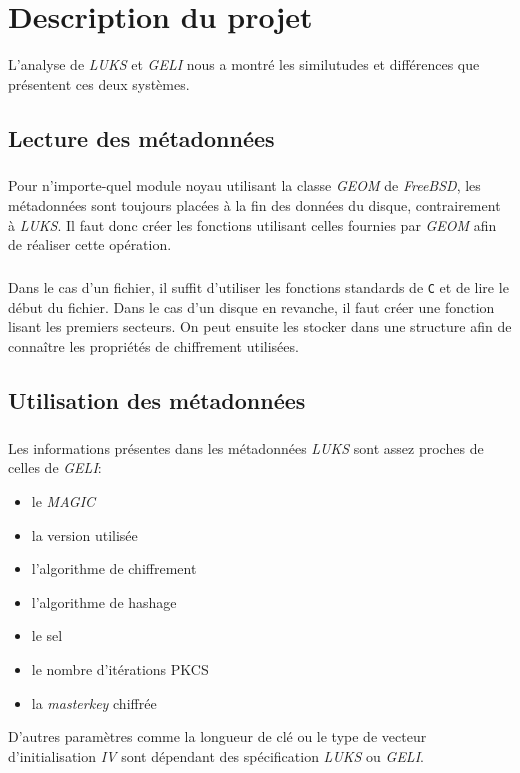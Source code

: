 \chapter{Description du projet}

L'analyse de \textit{LUKS} et \textit{GELI} nous a montré les similutudes et
différences que présentent ces deux systèmes.

\section{Lecture des métadonnées}
\paragraph{}
Pour n'importe-quel module noyau utilisant la classe \textit{GEOM} de
\textit{FreeBSD}, les métadonnées sont toujours placées à la fin des données du
disque, contrairement à \textit{LUKS}. Il faut donc créer les fonctions
utilisant celles fournies par \textit{GEOM} afin de réaliser cette opération.
\paragraph{}
Dans le cas d'un fichier, il suffit d'utiliser les fonctions standards de
\verb|C| et de lire le début du fichier. Dans le cas d'un disque en revanche, il
faut créer une fonction lisant les premiers secteurs. On peut ensuite les
stocker dans une structure afin de connaître les propriétés de chiffrement
utilisées.

\section{Utilisation des métadonnées}
\paragraph{}
Les informations présentes dans les métadonnées \textit{LUKS} sont assez proches
de celles de \textit{GELI}:
\begin{itemize}
\item le \textit{MAGIC}
\item la version utilisée
\item l'algorithme de chiffrement
\item l'algorithme de hashage
\item le sel
\item le nombre d'itérations PKCS
\item la \textit{masterkey} chiffrée
\end{itemize}
D'autres paramètres comme la longueur de clé ou le type de vecteur
d'initialisation \textit{IV} sont dépendant des spécification \textit{LUKS} ou
\textit{GELI}.
